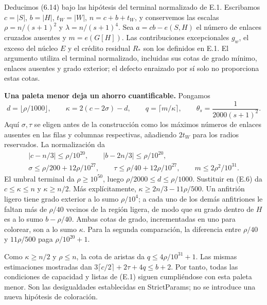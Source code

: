 \documentclass[spanish,11pt,a4paper]{article}
\begin{document}
Deducimos (6.14) bajo las hipótesis del terminal normalizado de E.1. Escribamos \(c=|S|\), \(b=|H|\), \(t_W=|W|\), \(n=c+b+t_W\), y conservemos las escalas \(\rho=n/(s+1)^2\) y \(\lambda=n/(s+1)^4\). Sea \(a=cb-e(S,H)\) el número de enlaces cruzados ausentes y \(m=e(G[H])\). Las contribuciones excepcionales \(g_w\), el exceso del núcleo \(E\) y el crédito residual \(R_*\) son los definidos en E.1. El argumento utiliza el terminal normalizado, incluidas sus cotas de grado mínimo, enlaces ausentes y grado exterior; el defecto enraizado por sí solo no proporciona estas cotas.

\textbf{Una paleta menor deja un ahorro cuantificable.} Pongamos \[
d=\lfloor\rho/1000\rfloor,\qquad
\kappa=2(c-2\sigma)-d,\qquad
q=\lceil m/\kappa\rceil,\qquad
\theta_s=\frac1{2000(s+1)^2}.
\tag{E.6}
\] Aquí \(\sigma,\tau\) se eligen antes de la construcción como los máximos números de enlaces ausentes en las filas y columnas respectivas, añadiendo \(2t_W\) para los radios reservados. La normalización da \[
\begin{gathered}
|c-n/3|\le\rho/10^{20},\qquad
|b-2n/3|\le\rho/10^{20},\\
\sigma\le\rho/200+12\rho/10^{27},\qquad
\tau\le\rho/40+12\rho/10^{27},\qquad
m\le2\rho^2/10^{31}.
\end{gathered}
\] El umbral terminal da \(\rho\ge10^{50}\), luego \(\rho/2000\le d\le\rho/1000\). Sustituir en (E.6) da \(c\le\kappa\le n\) y \(\kappa\ge n/2\). Más explícitamente, \(\kappa\ge2n/3-11\rho/500\). Un anfitrión ligero tiene grado exterior a lo sumo \(\rho/10^4\); a cada uno de los demás anfitriones le faltan más de \(\rho/40\) vecinos de la región ligera, de modo que su grado dentro de \(H\) es a lo sumo \(b-\rho/40\). Ambas cotas de grado, incrementadas en uno para colorear, son a lo sumo \(\kappa\). Para la segunda comparación, la diferencia entre \(\rho/40\) y \(11\rho/500\) paga \(\rho/10^{20}+1\).

Como \(\kappa\ge n/2\) y \(\rho\le n\), la cota de aristas da \(q\le4\rho/10^{31}+1\). Las mismas estimaciones mostradas dan \(3\lceil c/2\rceil+2\tau+4q\le b+2\). Por tanto, todas las condiciones de capacidad y listas de (E.1) siguen cumpliéndose con esta paleta menor. Son las desigualdades establecidas en StrictParams; no se introduce una nueva hipótesis de coloración.
\end{document}
